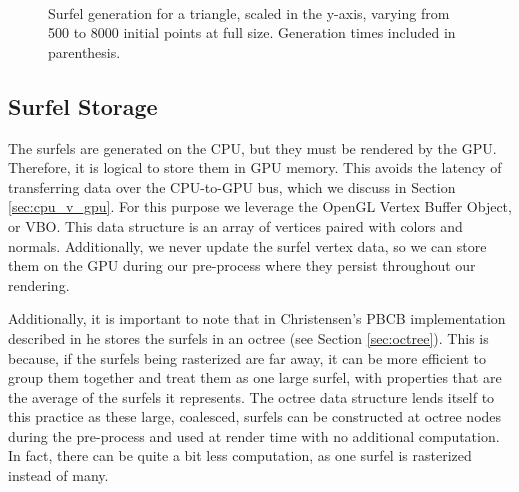 \begin{figure}[h!]
   \\
   \captionfonts
   \caption[Triangle surfels at full size]{Surfel generation for a triangle, scaled in the y-axis, varying from 500 to 8000 initial points at full size. Generation times included in parenthesis.}
   \label{fig:triangle_surfels}
\end{figure}

\subsection{Surfel Storage}
\label{sec:VBOStorage}

The surfels are generated on the CPU, but they must be rendered by the GPU. Therefore, it is logical to store them in GPU memory. This avoids the latency of transferring data over the CPU-to-GPU bus, which we discuss in Section \ref{sec:cpu_v_gpu}. For this purpose we leverage the OpenGL Vertex Buffer Object, or VBO. This data structure is an array of vertices paired with colors and normals. Additionally, we never update the surfel vertex data, so we can store them on the GPU during our pre-process where they persist throughout our rendering.

Additionally, it is important to note that in Christensen's PBCB implementation described in \cite{bib:christensen2008} he stores the surfels in an octree (see Section \ref{sec:octree}). This is because, if the surfels being rasterized are far away, it can be more efficient to group them together and treat them as one large surfel, with properties that are the average of the surfels it represents. The octree data structure lends itself to this practice as these large, coalesced, surfels can be constructed at octree nodes during the pre-process and used at render time with no additional computation. In fact, there can be quite a bit less computation, as one surfel is rasterized instead of many.

